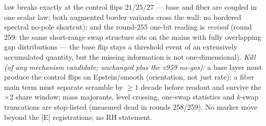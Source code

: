 {law breaks exactly at the control flips $21/25/27$ --- base and
fiber are coupled in one scalar law; both augmented border
variants cross the wall: no bordered spectral no-pole shortcut);
and the round-255 one-bit reading is \emph{revised} (round 259:
the same short-range swap structure sits on the mains with fully
overlapping gap distributions --- the base flip stays a threshold
event of an extensively accumulated quantity, but the missing
information is not one-dimensional).  \emph{Kill (of any
mechanism candidate; unchanged plus the v959 no-gos):} a base
layer must produce the control flips on Epstein/smooth
(orientation, not just rate); a fiber main term must separate
scramble by $\ge 1$ decade before readout and survive the
$\times2$ share window; mass majorants, level crossing, one-swap
statistics and $k$-swap truncations are stop-listed (measured
dead in rounds 258/259).  No marker move beyond the [E]
registrations; no RH statement.\par}


